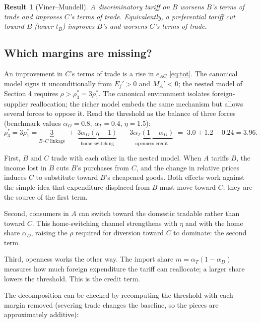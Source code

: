 \documentclass[11pt]{article}
\newtheorem{result}{Result}[section]
\begin{document}
\begin{result}[Viner--Mundell]
A discriminatory tariff on $B$ worsens $B$'s terms of trade and \emph{improves} $C$'s terms of trade. Equivalently, a preferential tariff cut toward $B$ (lower $t_B$) improves $B$'s and worsens $C$'s terms of trade.
\end{result}

\subsection{Which margins are missing?}

An improvement in $C$'s terms of trade is a rise in $e_{AC}$ \eqref{eq:tot}. The canonical model signs it unconditionally from $E_j' > 0$ and $M_A' < 0$; the nested model of Section 4 requires $\rho > \rho_3^* = 3\rho_1^*$. The canonical environment isolates foreign-supplier reallocation; the richer model embeds the same mechanism but allows several forces to oppose it. Read the threshold as the balance of three forces (benchmark values $\alpha_D = 0.8$, $\alpha_T = 0.4$, $\eta = 1.5$):
\begin{equation}
\rho_3^* = 3\rho_1^* = \underbrace{3}_{\text{$B$--$C$ linkage}}
\;+\; \underbrace{3\alpha_D(\eta-1)}_{\text{home switching}}
\;-\; \underbrace{3\alpha_T(1-\alpha_D)}_{\text{openness credit}}
\;=\; 3.0 + 1.2 - 0.24 = 3.96 .
\label{eq:pta-decomp}
\end{equation}

First, $B$ and $C$ trade with each other in the nested model. When $A$ tariffs $B$, the income lost in $B$ cuts $B$'s purchases from $C$, and the change in relative prices induces $C$ to substitute toward $B$'s cheapened goods. Both effects work against the simple idea that expenditure displaced from $B$ must move toward $C$; they are the source of the first term.

Second, consumers in $A$ can switch toward the domestic tradable rather than toward $C$. This home-switching channel strengthens with $\eta$ and with the home share $\alpha_D$, raising the $\rho$ required for diversion toward $C$ to dominate: the second term.

Third, openness works the other way. The import share $m = \alpha_T(1-\alpha_D)$ measures how much foreign expenditure the tariff can reallocate; a larger share lowers the threshold. This is the credit term.

The decomposition can be checked by recomputing the threshold with each margin removed (severing trade changes the baseline, so the pieces are approximately additive):
\end{document}
